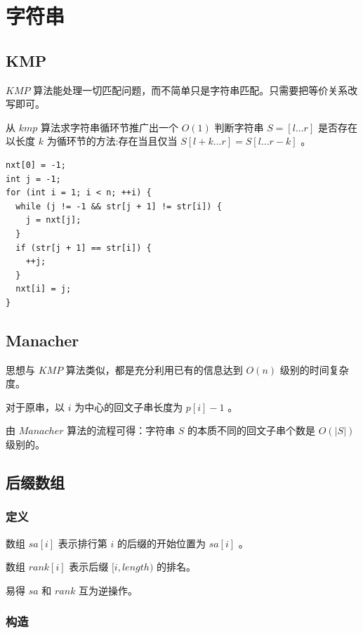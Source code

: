 \documentclass[11pt]{article}
\begin{document}
\section{字符串}
\label{sec-5}
\subsection{KMP}
\label{sec-5-1}

$KMP$ 算法能处理一切匹配问题，而不简单只是字符串匹配。只需要把等价关系改写即可。

从 $kmp$ 算法求字符串循环节推广出一个 $O(1)$ 判断字符串 $S=[l...r]$ 是否存在以长度 $k$ 为循环节的方法:存在当且仅当 $S[l+k...r]=S[l...r-k]$ 。

\begin{verbatim}
nxt[0] = -1;
int j = -1;
for (int i = 1; i < n; ++i) {
  while (j != -1 && str[j + 1] != str[i]) {
    j = nxt[j];
  }
  if (str[j + 1] == str[i]) {
    ++j;
  }
  nxt[i] = j;
}
\end{verbatim}
\subsection{Manacher}
\label{sec-5-2}

思想与 $KMP$ 算法类似，都是充分利用已有的信息达到 $O(n)$ 级别的时间复杂度。

对于原串，以 $i$ 为中心的回文子串长度为 $p[i]-1$ 。

由 $Manacher$ 算法的流程可得：字符串 $S$ 的本质不同的回文子串个数是 $O(|S|)$ 级别的。

\subsection{后缀数组}
\label{sec-5-3}
\subsubsection{定义}
\label{sec-5-3-1}

数组 $sa[i]$ 表示排行第 $i$ 的后缀的开始位置为 $sa[i]$ 。

数组 $rank[i]$ 表示后缀 $[i,length)$ 的排名。

易得 $sa$ 和 $rank$ 互为逆操作。

\subsubsection{构造}
\label{sec-5-3-2}
\end{document}
